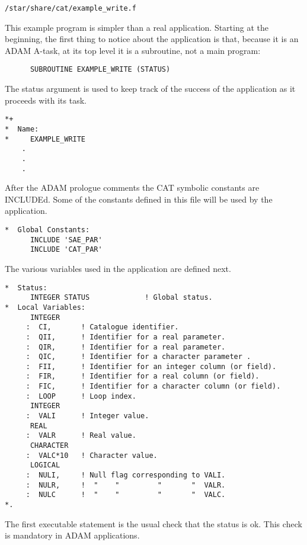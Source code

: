 \begin{center}
{\tt /star/share/cat/example\_write.f}
\end{center}

This example program is simpler than a real application. Starting at the
beginning, the first thing to notice about the application is that, 
because it is an ADAM A-task, at its top level it is a subroutine, not 
a main program:

\begin{verbatim}
      SUBROUTINE EXAMPLE_WRITE (STATUS)
\end{verbatim}

The status argument is used to keep track of the success of the 
application as it proceeds with its task.

\begin{verbatim}
*+
*  Name:
*     EXAMPLE_WRITE
    .
    .
    .
\end{verbatim}

After the ADAM prologue comments the CAT symbolic constants are
INCLUDEd. Some of the constants defined in this file will be used by
the application.

\begin{verbatim}
*  Global Constants:
      INCLUDE 'SAE_PAR'
      INCLUDE 'CAT_PAR'
\end{verbatim}

The various variables used in the application are defined next.

\begin{verbatim}
*  Status:
      INTEGER STATUS             ! Global status.
*  Local Variables:
      INTEGER 
     :  CI,       ! Catalogue identifier.
     :  QII,      ! Identifier for a real parameter.
     :  QIR,      ! Identifier for a real parameter.
     :  QIC,      ! Identifier for a character parameter .
     :  FII,      ! Identifier for an integer column (or field).
     :  FIR,      ! Identifier for a real column (or field).
     :  FIC,      ! Identifier for a character column (or field).
     :  LOOP      ! Loop index.
      INTEGER
     :  VALI      ! Integer value.
      REAL
     :  VALR      ! Real value.
      CHARACTER
     :  VALC*10   ! Character value.
      LOGICAL
     :  NULI,     ! Null flag corresponding to VALI.
     :  NULR,     !  "    "         "       "  VALR.
     :  NULC      !  "    "         "       "  VALC.
*.
\end{verbatim}

The first executable statement is the usual check that the status is ok.
This check is mandatory in ADAM applications.


